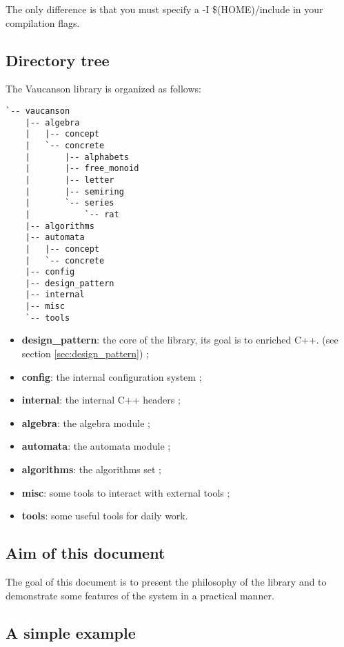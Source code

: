 \documentclass{article}
\begin{document}
The only difference is that you must specify a -I \$(HOME)/include in
your compilation flags.

\subsection{Directory tree}

The Vaucanson library is organized as follows: 

\begin{verbatim}
`-- vaucanson
    |-- algebra
    |   |-- concept
    |   `-- concrete
    |       |-- alphabets
    |       |-- free_monoid
    |       |-- letter
    |       |-- semiring
    |       `-- series
    |           `-- rat
    |-- algorithms
    |-- automata
    |   |-- concept
    |   `-- concrete
    |-- config
    |-- design_pattern
    |-- internal
    |-- misc
    `-- tools
\end{verbatim}

\begin{itemize}
\item \textbf{design_pattern}: the core of the library, its goal is to
  enriched C++. (see section \ref{sec:design_pattern}) ;

\item \textbf{config}: the internal configuration system ;
\item \textbf{internal}: the internal C++ headers ;
\item \textbf{algebra}: the algebra module ;
\item \textbf{automata}: the automata module ;
\item \textbf{algorithms}: the algorithms set ;
\item \textbf{misc}: some tools to interact with external tools ;
\item \textbf{tools}: some useful tools for daily work.
\end{itemize}

\subsection{Aim of this document}

The goal of this document is to present the philosophy of the library
and to demonstrate some features of the system in a practical manner.

\subsection{A simple example}
\end{document}
